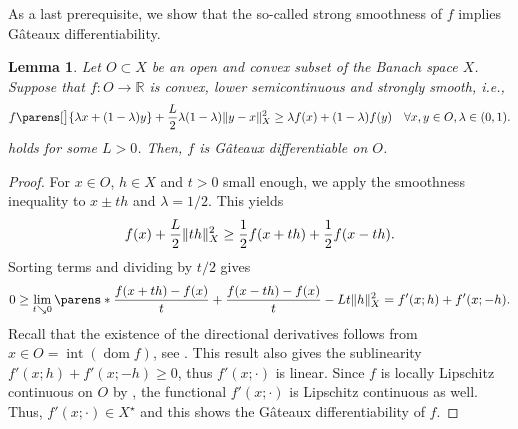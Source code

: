 \documentclass[
	english
]{scrartcl}
\numberwithin{equation}{section} %
\let\cite\parencite
\DeclarePairedDelimiter\norm{\lVert}{\rVert}
\DeclarePairedDelimiter\parens()
\newcommand\R{\mathbb{R}}
\newcommand{\dualspace}{^\star}
\newcommand\dom{\operatorname{dom}}
\newcommand\interior{\operatorname{int}}
\newtheorem{lemma}[theorem]{Lemma}
\begin{document}
As a last prerequisite,
we show that the so-called strong smoothness of $f$ implies
Gâteaux differentiability.
\begin{lemma}
	\label{lem:smooth_implies_differentiable}
	Let $O \subset X$ be an open and convex subset of the Banach space $X$.
	Suppose that $f \colon O \to \R$ is convex, lower semicontinuous
	and strongly smooth, i.e.,
	\begin{equation*}
		f\parens[\big]{ \lambda x + (1-\lambda) y}
		+
		\frac{L}{2} \lambda (1-\lambda) \norm{y - x}_X^2
		\ge
		\lambda f(x) + (1-\lambda) f(y)
		\quad\forall x,y \in O, \lambda \in (0,1)
		.
	\end{equation*}
	holds for some $L > 0$.
	Then, $f$ is Gâteaux differentiable on $O$.
\end{lemma}
\begin{proof}
	For $x \in O$, $h \in X$ and $t > 0$ small enough,
	we apply the smoothness inequality to $x \pm t h$
	and $\lambda = 1/2$.
	This yields
	\begin{equation*}
		f(x) + \frac{L}{2} \norm{t h}_X^2
		\ge
		\frac12 f(x + t h) + \frac12 f(x - t h).
	\end{equation*}
	Sorting terms and dividing by $t/2$ gives
	\begin{equation*}
		0
		\ge
		\lim_{t \searrow 0}
		\parens*{
			\frac{f(x + t h) - f(x)}{t} + \frac{f(x - t h) - f(x)}{t}
			-
			L t \norm{h}_X^2
		}
		=
		f'(x; h) + f'(x; -h)
		.
	\end{equation*}
	Recall that the existence of the directional derivatives
	follows from $x \in O = \interior(\dom f)$,
	see \cite[Theorem~2.1.13]{Zalinescu2002}.
	This result also gives the sublinearity $f'(x; h) + f'(x; -h) \ge 0$,
	thus $f'(x; \cdot)$ is linear.
	Since $f$ is locally Lipschitz continuous on $O$ by
	\cite[Theorems~2.2.11, 2.2.20]{Zalinescu2002},
	the functional $f'(x; \cdot)$
	is Lipschitz continuous as well.
	Thus, $f'(x; \cdot) \in X\dualspace$
	and this shows the Gâteaux differentiability of $f$.
\end{proof}
\end{document}
